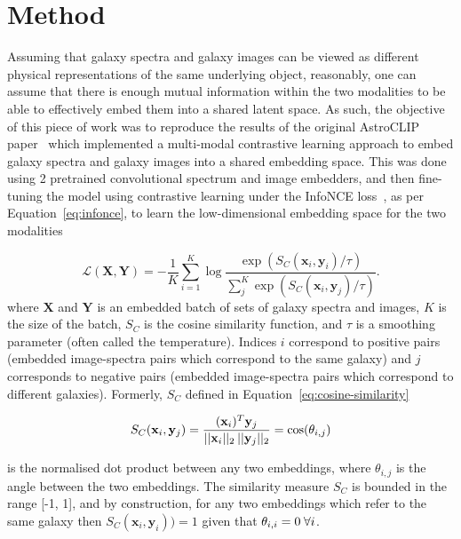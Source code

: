
\section{Method}\label{sec:method}
Assuming that galaxy spectra and galaxy images can be viewed as different physical representations of the same underlying
object, reasonably, one can assume that there is enough mutual information within the two modalities to be able to effectively
embed them into a shared latent space.
As such, the objective of this piece of work was to reproduce the results of the original AstroCLIP paper~\citep{astroclip}
which implemented a multi-modal contrastive learning approach to embed galaxy spectra and galaxy images into a shared embedding
space.
This was done using 2 pretrained convolutional spectrum and image embedders, and then fine-tuning the model using contrastive
learning under the InfoNCE loss~\citep{oord2019}, as per Equation~\eqref{eq:infonce}, to learn the low-dimensional
embedding space for the two modalities

\begin{equation}
\label{eq:infonce}
    \mathcal{L}(\mathbf{X}, \mathbf{Y}) = - \frac{1}{K} \sum_{i=1}^K \log \frac{\exp(S_C(\mathbf{x}_i, \mathbf{y}_i) / \tau)}{\sum_{j}^K \exp(S_C(\mathbf{x}_i, \mathbf{y}_j) / \tau)}.
\end{equation}
where $\mathbf{X}$ and $\mathbf{Y}$ is an embedded batch of sets of galaxy spectra and images, $K$ is the size of the
batch, $S_C$ is the cosine similarity function, and $\tau$ is a smoothing parameter (often called the temperature).
Indices $i$ correspond to positive pairs (embedded image-spectra pairs which correspond to the same galaxy) and $j$ corresponds
to negative pairs (embedded image-spectra pairs which correspond to different galaxies).
Formerly, $S_C$ defined in Equation~\eqref{eq:cosine-similarity}

\begin{equation}
\label{eq:cosine-similarity}
    S_C(\mathbf{x}_i, \mathbf{y}_j) = \frac{(\mathbf{x}_i)^{T} \mathbf{y}_j}{ ||\mathbf{x}_i||_{2} \hspace{0.2em} ||\mathbf{y}_j||_{2}}
    = \cos(\theta_{i,j})
\end{equation}

is the normalised dot product between any two embeddings, where $\theta_{i,j}$ is the angle between the two embeddings.
The similarity measure $S_C$ is bounded in the range [-1, 1], and by construction, for any two embeddings which refer to
the same galaxy then $S_C(\mathbf{x}_i, \mathbf{y}_i)) = 1$ given that $\theta_{i,i} = 0 \hspace{0.25em} \forall i$.

